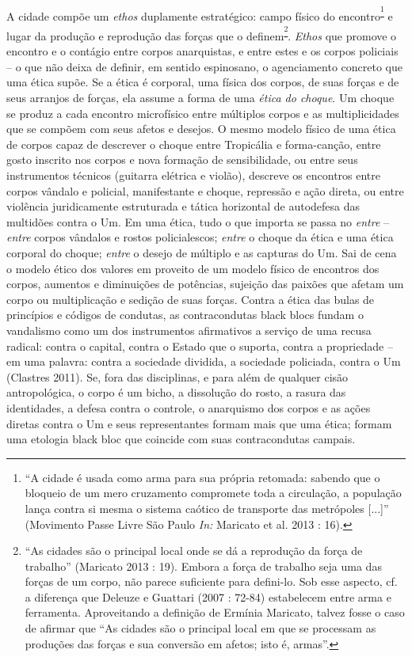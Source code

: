 A cidade compõe um \emph{ethos }duplamente\emph{ }estratégico: campo
físico do encontro\textsuperscript{\footnote{``A cidade é usada como
  arma para sua própria retomada: sabendo que o bloqueio de um mero
  cruzamento compromete toda a circulação, a população lança contra si
  mesma o sistema caótico de transporte das metrópoles {[}...{]}''
  (Movimento Passe Livre São Paulo \emph{In: }Maricato et al. 2013 :
  16).}} e lugar da produção e reprodução das forças que o
definem\textsuperscript{\footnote{``As cidades são o principal local
  onde se dá a reprodução da força de trabalho'' (Maricato 2013 : 19).
  Embora a força de trabalho seja uma das forças de um corpo, não parece
  suficiente para defini-lo. Sob esse aspecto, cf. a diferença que
  Deleuze e Guattari (2007 : 72-84) estabelecem entre arma e ferramenta.
  Aproveitando a definição de Ermínia Maricato, talvez fosse o caso de
  afirmar que ``As cidades são o principal local em que se processam as
  produções das forças e sua conversão em afetos; isto é, armas''.}}.
\emph{Ethos} que promove o encontro e o contágio entre corpos
anarquistas, e entre estes e os corpos policiais -- o que não deixa de
definir, em sentido espinosano, o agenciamento concreto que uma ética
supõe. Se a ética é corporal, uma física dos corpos, de suas forças e de
seus arranjos de forças, ela assume a forma de uma \emph{ética do
choque}. Um choque se produz a cada encontro microfísico entre múltiplos
corpos e as multiplicidades que se compõem com seus afetos e desejos. O
mesmo modelo físico de uma ética de corpos capaz de descrever o choque
entre Tropicália e forma-canção, entre gosto inscrito nos corpos e nova
formação de sensibilidade, ou entre seus instrumentos técnicos (guitarra
elétrica e violão), descreve os encontros entre corpos vândalo e
policial, manifestante e choque, repressão e ação direta, ou entre
violência juridicamente estruturada e tática horizontal de autodefesa
das multidões contra o Um. Em uma ética, tudo o que importa se passa no
\emph{entre} -- \emph{entre }corpos vândalos e rostos policialescos;
\emph{entre }o choque da ética e uma ética corporal do choque;
\emph{entre} o desejo de múltiplo e as capturas do Um. Sai de cena o
modelo ético dos valores em proveito de um modelo físico de encontros
dos corpos, aumentos e diminuições de potências, sujeição das paixões
que afetam um corpo ou multiplicação e sedição de suas forças. Contra a
ética das bulas de princípios e códigos de condutas, as contracondutas
black blocs fundam o vandalismo como um dos instrumentos afirmativos a
serviço de uma recusa radical: contra o capital, contra o Estado que o
suporta, contra a propriedade -- em uma palavra: contra a sociedade
dividida, a sociedade policiada, contra o Um (Clastres 2011). Se, fora
das disciplinas, e para além de qualquer cisão antropológica, o corpo é
um bicho, a dissolução do rosto, a rasura das identidades, a defesa
contra o controle, o anarquismo dos corpos e as ações diretas contra o
Um e seus representantes formam mais que uma ética; formam uma etologia
black bloc que coincide com suas contracondutas campais.

